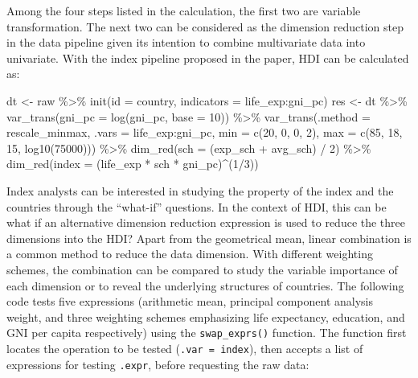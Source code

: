 \documentclass[
]{interact}
\newenvironment{Shaded}{\begin{snugshade}}{\end{snugshade}}
\newcommand{\AttributeTok}[1]{\textcolor[rgb]{0.40,0.45,0.13}{#1}}
\newcommand{\DecValTok}[1]{\textcolor[rgb]{0.68,0.00,0.00}{#1}}
\newcommand{\FunctionTok}[1]{\textcolor[rgb]{0.28,0.35,0.67}{#1}}
\newcommand{\NormalTok}[1]{\textcolor[rgb]{0.00,0.23,0.31}{#1}}
\newcommand{\OtherTok}[1]{\textcolor[rgb]{0.00,0.23,0.31}{#1}}
\newcommand{\SpecialCharTok}[1]{\textcolor[rgb]{0.37,0.37,0.37}{#1}}
\begin{document}
Among the four steps listed in the calculation, the first two are
variable transformation. The next two can be considered as the dimension
reduction step in the data pipeline given its intention to combine
multivariate data into univariate. With the index pipeline proposed in
the paper, HDI can be calculated as:

\begin{Shaded}
\begin{Highlighting}[]
\NormalTok{dt }\OtherTok{\textless{}{-}}\NormalTok{ raw }\SpecialCharTok{\%\textgreater{}\%} \FunctionTok{init}\NormalTok{(}\AttributeTok{id =}\NormalTok{ country, }\AttributeTok{indicators =}\NormalTok{ life\_exp}\SpecialCharTok{:}\NormalTok{gni\_pc)}
\NormalTok{res }\OtherTok{\textless{}{-}}\NormalTok{ dt }\SpecialCharTok{\%\textgreater{}\%}
  \FunctionTok{var\_trans}\NormalTok{(}\AttributeTok{gni\_pc =} \FunctionTok{log}\NormalTok{(gni\_pc, }\AttributeTok{base =} \DecValTok{10}\NormalTok{)) }\SpecialCharTok{\%\textgreater{}\%} 
  \FunctionTok{var\_trans}\NormalTok{(}\AttributeTok{.method =}\NormalTok{ rescale\_minmax, }\AttributeTok{.vars =}\NormalTok{ life\_exp}\SpecialCharTok{:}\NormalTok{gni\_pc,}
            \AttributeTok{min =} \FunctionTok{c}\NormalTok{(}\DecValTok{20}\NormalTok{, }\DecValTok{0}\NormalTok{, }\DecValTok{0}\NormalTok{, }\DecValTok{2}\NormalTok{), }\AttributeTok{max =} \FunctionTok{c}\NormalTok{(}\DecValTok{85}\NormalTok{, }\DecValTok{18}\NormalTok{, }\DecValTok{15}\NormalTok{, }\FunctionTok{log10}\NormalTok{(}\DecValTok{75000}\NormalTok{))) }\SpecialCharTok{\%\textgreater{}\%} 
  \FunctionTok{dim\_red}\NormalTok{(}\AttributeTok{sch =}\NormalTok{ (exp\_sch }\SpecialCharTok{+}\NormalTok{ avg\_sch) }\SpecialCharTok{/} \DecValTok{2}\NormalTok{) }\SpecialCharTok{\%\textgreater{}\%}
  \FunctionTok{dim\_red}\NormalTok{(}\AttributeTok{index =}\NormalTok{ (life\_exp }\SpecialCharTok{*}\NormalTok{ sch }\SpecialCharTok{*}\NormalTok{ gni\_pc)}\SpecialCharTok{\^{}}\NormalTok{(}\DecValTok{1}\SpecialCharTok{/}\DecValTok{3}\NormalTok{))}
\end{Highlighting}
\end{Shaded}

Index analysts can be interested in studying the property of the index
and the countries through the ``what-if'' questions. In the context of
HDI, this can be what if an alternative dimension reduction expression
is used to reduce the three dimensions into the HDI? Apart from the
geometrical mean, linear combination is a common method to reduce the
data dimension. With different weighting schemes, the combination can be
compared to study the variable importance of each dimension or to reveal
the underlying structures of countries. The following code tests five
expressions (arithmetic mean, principal component analysis weight, and
three weighting schemes emphasizing life expectancy, education, and GNI
per capita respectively) using the \texttt{swap\_exprs()} function. The
function first locates the operation to be tested
(\texttt{.var\ =\ index}), then accepts a list of expressions for
testing \texttt{.expr}, before requesting the raw data:
\end{document}
